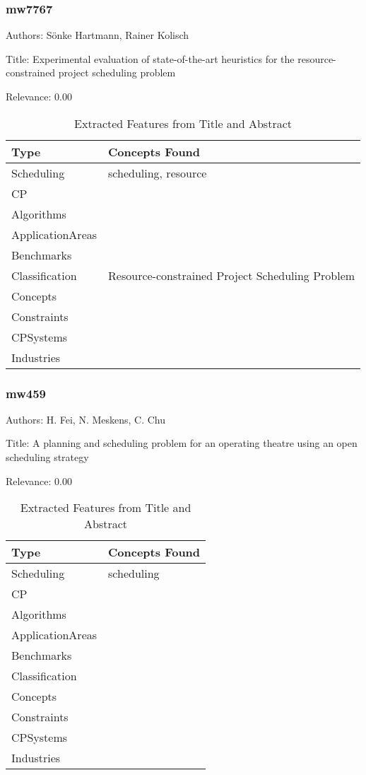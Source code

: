\subsubsection{mw7767}
\label{mw:mw7767}

Authors: Sönke Hartmann, Rainer Kolisch

Title: Experimental evaluation of state-of-the-art heuristics for the resource-constrained project scheduling problem

Relevance:  0.00

{\scriptsize
\begin{longtable}{p{2cm}p{20cm}}
\caption{Extracted Features from Title and Abstract}\\ \toprule
Type & Concepts Found\\ \midrule
\endhead
\bottomrule
\endfoot
Scheduling & scheduling, resource\\ 
CP & \\ 
Algorithms & \\ 
ApplicationAreas & \\ 
Benchmarks & \\ 
Classification & Resource-constrained Project Scheduling Problem\\ 
Concepts & \\ 
Constraints & \\ 
CPSystems & \\ 
Industries & \\ 
\end{longtable}
}



\subsubsection{mw459}
\label{mw:mw459}

Authors: H. Fei, N. Meskens, C. Chu

Title: A planning and scheduling problem for an operating theatre using an open scheduling strategy

Relevance:  0.00

{\scriptsize
\begin{longtable}{p{2cm}p{20cm}}
\caption{Extracted Features from Title and Abstract}\\ \toprule
Type & Concepts Found\\ \midrule
\endhead
\bottomrule
\endfoot
Scheduling & scheduling\\ 
CP & \\ 
Algorithms & \\ 
ApplicationAreas & \\ 
Benchmarks & \\ 
Classification & \\ 
Concepts & \\ 
Constraints & \\ 
CPSystems & \\ 
Industries & \\ 
\end{longtable}
}



